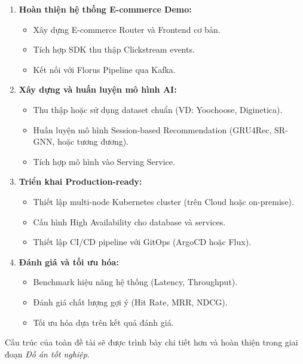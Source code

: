 \begin{enumerate}
    \item \textbf{Hoàn thiện hệ thống E-commerce Demo:}
    \begin{itemize}
        \item Xây dựng E-commerce Router và Frontend cơ bản.
        \item Tích hợp SDK thu thập Clickstream events.
        \item Kết nối với Florus Pipeline qua Kafka.
    \end{itemize}

    \item \textbf{Xây dựng và huấn luyện mô hình AI:}
    \begin{itemize}
        \item Thu thập hoặc sử dụng dataset chuẩn (VD: Yoochoose, Diginetica).
        \item Huấn luyện mô hình Session-based Recommendation (GRU4Rec, SR-GNN, hoặc tương đương).
        \item Tích hợp mô hình vào Serving Service.
    \end{itemize}

    \item \textbf{Triển khai Production-ready:}
    \begin{itemize}
        \item Thiết lập multi-node Kubernetes cluster (trên Cloud hoặc on-premise).
        \item Cấu hình High Availability cho database và services.
        \item Thiết lập CI/CD pipeline với GitOps (ArgoCD hoặc Flux).
    \end{itemize}

    \item \textbf{Đánh giá và tối ưu hóa:}
    \begin{itemize}
        \item Benchmark hiệu năng hệ thống (Latency, Throughput).
        \item Đánh giá chất lượng gợi ý (Hit Rate, MRR, NDCG).
        \item Tối ưu hóa dựa trên kết quả đánh giá.
    \end{itemize}
\end{enumerate}
Cấu trúc của toàn đề tài sẽ được trình bày chi tiết hơn và hoàn thiện trong giai đoạn \textit{Đồ án tốt nghiệp}.